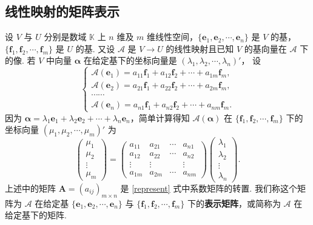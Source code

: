\documentclass[12pt, a4paper,newtx]{ctexart}
\begin{document}
\subsection{线性映射的矩阵表示}\label{liner-map-matrix}
设 $V$ 与 $U$ 分别是数域 $\mathbb{K}$ 上 $n$ 维及 $m$ 维线性空间，$\{\bm{e}_1, \bm{e}_2, \cdots, \bm{e}_n\}$ 是 $V$ 的基，$\{\bm{f}_1, \bm{f}_2, \cdots, \bm{f}_m\}$ 是 $U$ 的基. 又设 $\mathcal{A}$ 是 $V\rightarrow U$ 的线性映射且已知 $V$ 的基向量在 $\mathcal{A}$ 下的像. 若 $V$ 中向量 $\bm{\alpha}$ 在给定基下的坐标向量是 $(\lambda_1, \lambda_2, \cdots, \lambda_n)'$，
设
\begin{equation}\label{represent}
\begin{cases}
	\mathcal{A}(\bm{e}_1) = a_{11}\bm{f}_1 + a_{12}\bm{f}_2 + \cdots + a_{1m}\bm{f}_m, \\
	\mathcal{A}(\bm{e}_2) = a_{21}\bm{f}_1 + a_{22}\bm{f}_2 + \cdots + a_{2m}\bm{f}_m, \\
	\cdots \cdots \\
	\mathcal{A}(\bm{e}_n) = a_{n1}\bm{f}_1 + a_{n2}\bm{f}_2 + \cdots + a_{nm}\bm{f}_m.
\end{cases} 
\end{equation}
因为 $\bm{\alpha} = \lambda_1 \bm{e}_1 + \lambda_2 \bm{e}_2 + \cdots + \lambda_n \bm{e}_n$，简单计算得知 $\mathcal{A}(\bm{\alpha})$ 在 $\{\bm{f}_1, \bm{f}_2, \cdots, \bm{f}_m\}$ 下的坐标向量 $(\mu_1, \mu_2, \cdots, \mu_m)'$ 为
\begin{equation}\label{matrixrepresent}
	\begin{pmatrix}
		\mu_1 \\
		\mu_2 \\
		\vdots \\
		\mu_m
	\end{pmatrix}
	=
	\begin{pmatrix}
		a_{11} & a_{21} & \cdots & a_{n1} \\
		a_{12} & a_{22} & \cdots & a_{n2} \\
		\vdots & \vdots & & \vdots \\
		a_{1m} & a_{2m} & \cdots & a_{nm}
	\end{pmatrix}
	\begin{pmatrix}
		\lambda_1 \\
		\lambda_2 \\
		\vdots \\
		\lambda_n
	\end{pmatrix}.
\end{equation}
上述中的矩阵 $\bm A = (a_{ij})_{m \times n}$ 是 \eqref{represent} 式中系数矩阵的转置. 我们称这个矩阵为 $\mathcal{A}$ 在给定基 $\{\bm{e}_1, \bm{e}_2, \cdots, \bm{e}_n\}$ 与 $\{\bm{f}_1, \bm{f}_2, \cdots, \bm{f}_m\}$ 下的\textbf{表示矩阵}，或简称为 $\mathcal{A}$ 在给定基下的矩阵. 
\end{document}
